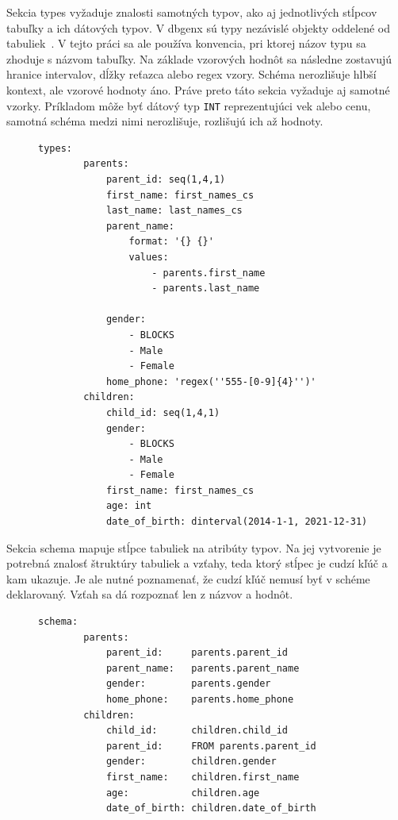 Sekcia types vyžaduje znalosti samotných typov, ako aj jednotlivých stĺpcov tabuľky a ich dátových typov. V dbgenx sú typy nezávislé objekty oddelené od tabuliek~\cite{Vlach2020}. V tejto práci sa ale používa konvencia, pri ktorej názov typu sa zhoduje s názvom tabuľky. Na základe vzorových hodnôt sa následne zostavujú hranice intervalov, dĺžky reťazca alebo regex vzory. Schéma nerozlišuje hlbší kontext, ale vzorové hodnoty áno. Práve preto táto sekcia vyžaduje aj samotné vzorky. Príkladom môže byť dátový typ \texttt{INT} reprezentujúci vek alebo cenu, samotná schéma medzi nimi nerozlišuje, rozlišujú ich až hodnoty.



\begin{figure}[H]
    \centering
    \begin{lstlisting}[caption={types sekcia pre ukážkovú databázu.}, frame=single, linewidth=0.9\textwidth, xleftmargin=0.100\textwidth, label={lst:recipe-types}]
    types:
        parents:
            parent_id: seq(1,4,1)
            first_name: first_names_cs
            last_name: last_names_cs
            parent_name:
                format: '{} {}'
                values:
                    - parents.first_name
                    - parents.last_name

            gender:
                - BLOCKS
                - Male
                - Female
            home_phone: 'regex(''555-[0-9]{4}'')'
        children:
            child_id: seq(1,4,1)
            gender:
                - BLOCKS
                - Male
                - Female
            first_name: first_names_cs
            age: int
            date_of_birth: dinterval(2014-1-1, 2021-12-31)
    \end{lstlisting}

\end{figure}

Sekcia schema mapuje stĺpce tabuliek na atribúty typov. Na jej vytvorenie je potrebná znalosť štruktúry tabuliek a vzťahy, teda ktorý stĺpec je cudzí kľúč a kam ukazuje. Je ale nutné poznamenať, že cudzí kľúč nemusí byť v schéme deklarovaný. Vzťah sa dá rozpoznať len z názvov a hodnôt. 


\begin{figure}[H]
    \centering
    \begin{lstlisting}[caption={Schema sekcia pre ukážkovú databázu.}, frame=single, linewidth=0.85\textwidth, xleftmargin=0.165\textwidth, label={lst:recipe-schema}]
    schema:
        parents:
            parent_id:     parents.parent_id
            parent_name:   parents.parent_name
            gender:        parents.gender
            home_phone:    parents.home_phone
        children:
            child_id:      children.child_id
            parent_id:     FROM parents.parent_id
            gender:        children.gender
            first_name:    children.first_name
            age:           children.age
            date_of_birth: children.date_of_birth
    \end{lstlisting}

\end{figure}


